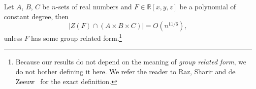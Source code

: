 \begin{theorem}
	Let $A$, $B$, $C$ be $n$-sets of real numbers and $F \in \mathbb{R}[x,y,z]$
	be a polynomial of constant degree, then
	\begin{displaymath}
		| Z(F) \cap ( A \times B \times C ) | = O(n^{11/6}),
	\end{displaymath}
	unless $F$ has some group related form.\footnote{Because our results do not
	depend on the meaning of \emph{group related form}, we do not bother
	defining it here. We refer the reader to Raz, Sharir and de Zeeuw~\cite{RSZ15}
	for the exact definition.}
\end{theorem}
